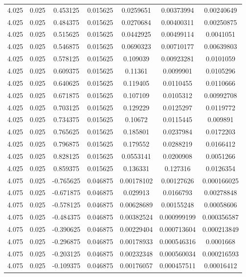 \begin{table}[bh]
\begin{center}
{\begin{tabular}{ccccccc}
4.025	 & 0.025 & 	0.453125	 & 0.015625	 & 0.0259651	 & 0.00373994	 & 0.00240649 \\ 
4.025	 & 0.025 & 	0.484375	 & 0.015625	 & 0.0270684	 & 0.00400311	 & 0.00250875 \\ 
4.025	 & 0.025 & 	0.515625	 & 0.015625	 & 0.0442925	 & 0.00499114	 & 0.0041051 \\ 
4.025	 & 0.025 & 	0.546875	 & 0.015625	 & 0.0690323	 & 0.00710177	 & 0.00639803 \\ 
4.025	 & 0.025 & 	0.578125	 & 0.015625	 & 0.109039	 & 0.00923281	 & 0.0101059 \\ 
4.025	 & 0.025 & 	0.609375	 & 0.015625	 & 0.11361	 & 0.0099901	 & 0.0105296 \\ 
4.025	 & 0.025 & 	0.640625	 & 0.015625	 & 0.119405	 & 0.0110455	 & 0.0110666 \\ 
4.025	 & 0.025 & 	0.671875	 & 0.015625	 & 0.107109	 & 0.0105312	 & 0.00992708 \\ 
4.025	 & 0.025 & 	0.703125	 & 0.015625	 & 0.129229	 & 0.0125297	 & 0.0119772 \\ 
4.025	 & 0.025 & 	0.734375	 & 0.015625	 & 0.10672	 & 0.0115445	 & 0.009891 \\ 
4.025	 & 0.025 & 	0.765625	 & 0.015625	 & 0.185801	 & 0.0237984	 & 0.0172203 \\ 
4.025	 & 0.025 & 	0.796875	 & 0.015625	 & 0.179552	 & 0.0288219	 & 0.0166412 \\ 
4.025	 & 0.025 & 	0.828125	 & 0.015625	 & 0.0553141	 & 0.0200908	 & 0.0051266 \\ 
4.025	 & 0.025 & 	0.859375	 & 0.015625	 & 0.136331	 & 0.127316	 & 0.0126354 \\ 
4.075	 & 0.025 & 	-0.765625	 & 0.046875	 & 0.00178102	 & 0.00127626	 & 0.000166025 \\ 
4.075	 & 0.025 & 	-0.671875	 & 0.046875	 & 0.029913	 & 0.0166793	 & 0.00278848 \\ 
4.075	 & 0.025 & 	-0.578125	 & 0.046875	 & 0.00628689	 & 0.00155248	 & 0.00058606 \\ 
4.075	 & 0.025 & 	-0.484375	 & 0.046875	 & 0.00382524	 & 0.000999199	 & 0.000356587 \\ 
4.075	 & 0.025 & 	-0.390625	 & 0.046875	 & 0.00229404	 & 0.000713604	 & 0.000213849 \\ 
4.075	 & 0.025 & 	-0.296875	 & 0.046875	 & 0.00178933	 & 0.000546316	 & 0.0001668 \\ 
4.075	 & 0.025 & 	-0.203125	 & 0.046875	 & 0.00232348	 & 0.000560034	 & 0.000216593 \\ 
4.075	 & 0.025 & 	-0.109375	 & 0.046875	 & 0.00176057	 & 0.000457511	 & 0.00016412 \\ 

\end{tabular}}
\end{center}
\end{table}
